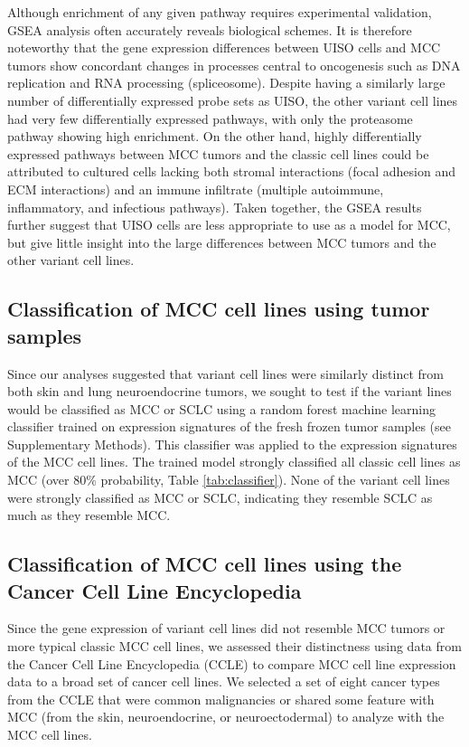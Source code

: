 \documentclass[10pt]{article}
\begin{document}
Although enrichment of any given pathway requires experimental validation, GSEA analysis often accurately reveals biological schemes.
It is therefore noteworthy that the gene expression differences between UISO cells and MCC tumors show concordant changes in processes central to oncogenesis such as DNA replication and RNA processing (spliceosome).
Despite having a similarly large number of differentially expressed probe sets as UISO, the other variant cell lines had very few differentially expressed pathways, with only the proteasome pathway showing high enrichment.
On the other hand, highly differentially expressed pathways between MCC tumors and the classic cell lines could be attributed to cultured cells lacking both stromal interactions (focal adhesion and ECM interactions) and an immune infiltrate (multiple autoimmune, inflammatory, and infectious pathways).
Taken together, the GSEA results further suggest that UISO cells are less appropriate to use as a model for MCC, but give little insight into the large differences between MCC tumors and the other variant cell lines.

\subsection*{Classification of MCC cell lines using tumor samples}
Since our analyses suggested that variant cell lines were similarly distinct from both skin and lung neuroendocrine tumors, we sought to test if the variant lines would be classified as MCC or SCLC using a random forest machine learning classifier trained on expression signatures of the fresh frozen tumor samples (see Supplementary Methods).
This classifier was applied to the expression signatures of the MCC cell lines.
The trained model strongly classified all classic cell lines as MCC (over 80\% probability, Table \ref{tab:classifier}). 
None of the variant cell lines were strongly classified as MCC or SCLC, indicating they resemble SCLC as much as they resemble MCC.

\subsection*{Classification of MCC cell lines using the Cancer Cell Line Encyclopedia}
Since the gene expression of variant cell lines did not resemble MCC tumors or more typical classic MCC cell lines, we assessed their distinctness using data from the Cancer Cell Line Encyclopedia (CCLE)\citep{Barretina2012Cancer} to compare MCC cell line expression data to a broad set of cancer cell lines.
We selected a set of eight cancer types from the CCLE that were common malignancies or shared some feature with MCC (from the skin, neuroendocrine, or neuroectodermal) to analyze with the MCC cell lines.
\end{document}
